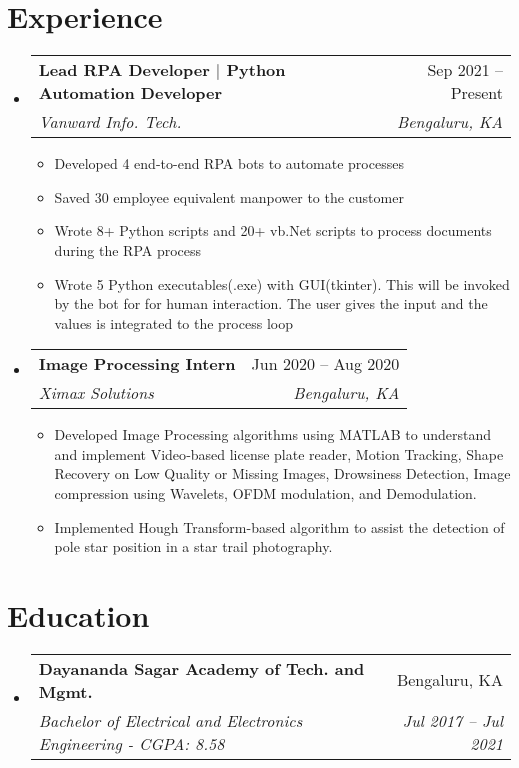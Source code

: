 \documentclass[letterpaper,11pt]{article}
\makeatletter
\newcommand{\resumeItem}[1]{
  \item\small{
    {#1 \vspace{-2pt}}
  }
}
\newcommand{\resumeSubheading}[4]{
  \vspace{-2pt}\item
    \begin{tabular*}{0.97\textwidth}[t]{l@{\extracolsep{\fill}}r}
      \textbf{#1} & #2 \\
      \textit{\small#3} & \textit{\small #4} \\
    \end{tabular*}\vspace{-7pt}
}
\newcommand{\resumeSubHeadingListStart}{\begin{itemize}[leftmargin=0.15in, label={}]}
\newcommand{\resumeSubHeadingListEnd}{\end{itemize}}
\newcommand{\resumeItemListStart}{\begin{itemize}}
\newcommand{\resumeItemListEnd}{\end{itemize}\vspace{-5pt}}
\makeatother
\begin{document}
\section{Experience}
  \resumeSubHeadingListStart

    \resumeSubheading
      {Lead RPA Developer $|$ {\transparent{0.75}Python Automation Developer}}{Sep 2021 -- Present}
      {Vanward Info. Tech.}{Bengaluru, KA}
      \resumeItemListStart
        \resumeItem{Developed 4 end-to-end RPA bots to automate processes}
        \resumeItem{Saved 30 employee equivalent manpower to the customer}
        \resumeItem{Wrote 8+ Python scripts and 20+ vb.Net scripts to process documents during the RPA process}
        \resumeItem{Wrote 5 Python executables(.exe) with GUI(tkinter). This will be invoked by the bot for for human interaction. The user gives the input and the values is integrated to the process loop}
    \resumeItemListEnd
    \resumeSubheading
      {Image Processing Intern}{Jun 2020 -- Aug 2020}
      {Ximax Solutions}{Bengaluru, KA}
      \resumeItemListStart
        \resumeItem{Developed Image Processing algorithms using MATLAB to understand and implement Video‐based license plate reader, Motion Tracking, Shape Recovery on Low Quality or Missing Images, Drowsiness Detection, Image compression using Wavelets, OFDM modulation, and Demodulation.}
        \resumeItem{Implemented Hough Transform-based algorithm to assist the detection of pole star position in a star trail photography.}
    \resumeItemListEnd
  \resumeSubHeadingListEnd

\section{Education}
  \resumeSubHeadingListStart
    \resumeSubheading
      {Dayananda Sagar Academy of Tech. and Mgmt.}{Bengaluru, KA}
      {Bachelor of Electrical and Electronics Engineering - CGPA: 8.58}{Jul 2017 -- Jul 2021}
  \resumeSubHeadingListEnd

\end{document}
